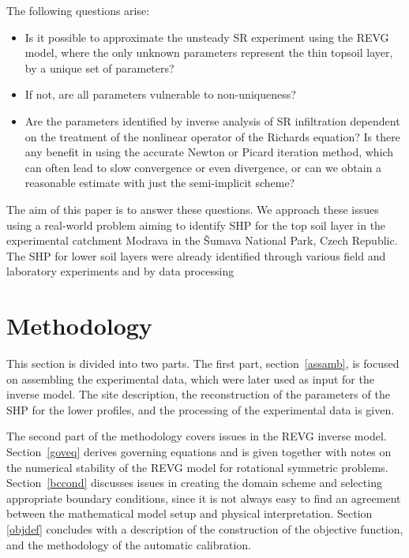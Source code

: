 \documentclass[review]{elsarticle}
\begin{document}
The following questions arise: 
\begin{itemize}
	\item Is it possible to approximate the unsteady SR experiment using the REVG model, where the only unknown parameters represent the thin topsoil layer, by a unique set of parameters? \
	\item If not, are all parameters vulnerable to non-uniqueness?
	\item Are the parameters identified by inverse analysis of SR infiltration dependent on the treatment of the nonlinear operator of the Richards equation? Is there any benefit in using the accurate Newton or Picard iteration method, which can often lead to slow convergence or even divergence, or can we obtain a reasonable estimate with just the semi-implicit scheme?
\end{itemize}



The aim of this paper is to answer these questions. We approach these issues using a real-world problem aiming to identify SHP for the top soil layer in the experimental catchment Modrava in the \v{S}umava National Park, Czech Republic. The SHP for lower soil layers were already identified through various field and laboratory experiments and by data processing %









\section{Methodology}%
\label{metodo}


This section is divided into two parts. The first part, section~\ref{assamb}, is focused on assembling the experimental data, which were later used as input for the inverse model. The site description, the reconstruction of the parameters of the SHP for the lower profiles, and the processing of the experimental data is given.   

The second part of the methodology covers issues in the REVG inverse model. Section~\ref{goveq} derives governing equations and is given together with notes on the numerical stability of the REVG model for rotational symmetric problems.
Section~\ref{bccond} discusses issues in creating the domain scheme and selecting appropriate boundary conditions, since it is not always easy to find an agreement between the mathematical model setup and  physical interpretation. Section \ref{objdef} concludes with a description of the construction of the objective function, and the methodology of the automatic calibration. 
\end{document}
